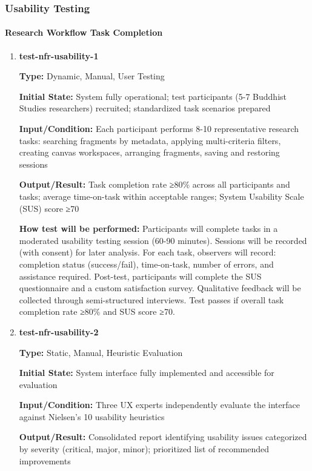 \documentclass[12pt, titlepage]{article}
\begin{document}
\subsubsection{Usability Testing}

\paragraph{Research Workflow Task Completion}

\begin{enumerate}

\item \textbf{test-nfr-usability-1}

\textbf{Type:} Dynamic, Manual, User Testing
					
\textbf{Initial State:} System fully operational; test participants (5-7 Buddhist Studies researchers) recruited; standardized task scenarios prepared
					
\textbf{Input/Condition:} Each participant performs 8-10 representative research tasks: searching fragments by metadata, applying multi-criteria filters, creating canvas workspaces, arranging fragments, saving and restoring sessions
					
\textbf{Output/Result:} Task completion rate ≥80\% across all participants and tasks; average time-on-task within acceptable ranges; System Usability Scale (SUS) score ≥70
					
\textbf{How test will be performed:} Participants will complete tasks in a moderated usability testing session (60-90 minutes). Sessions will be recorded (with consent) for later analysis. For each task, observers will record: completion status (success/fail), time-on-task, number of errors, and assistance required. Post-test, participants will complete the SUS questionnaire and a custom satisfaction survey. Qualitative feedback will be collected through semi-structured interviews. Test passes if overall task completion rate ≥80\% and SUS score ≥70.

\item \textbf{test-nfr-usability-2}

\textbf{Type:} Static, Manual, Heuristic Evaluation
					
\textbf{Initial State:} System interface fully implemented and accessible for evaluation
					
\textbf{Input/Condition:} Three UX experts independently evaluate the interface against Nielsen's 10 usability heuristics
					
\textbf{Output/Result:} Consolidated report identifying usability issues categorized by severity (critical, major, minor); prioritized list of recommended improvements
					

\end{enumerate}
\end{document}
